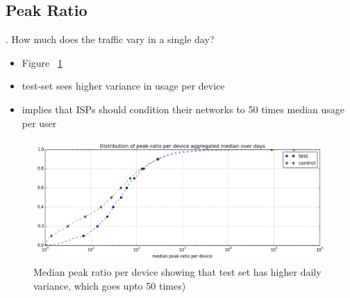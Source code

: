 \subsection{Peak Ratio}
\label{subsec:peak-ratio}




. How much does the traffic vary in a single day?

\begin{itemize}
\itemsep0em 
\item Figure ~\ref{fig:CDF-peak-ratio-median}
\item test-set sees higher variance in usage per device
\item implies that ISPs should condition their networks to 50 times median usage per user
\end{itemize}



\begin{figure}[ht!]
\begin{minipage}{0.90\linewidth}
\centering
\includegraphics[width=1\linewidth]{figures/peakratio-CDF-devices-MEDIAN.png}
\caption{Median peak ratio per device showing that test set has higher daily variance, which goes upto 50 times)}
\label{fig:CDF-peak-ratio-median}
\end{minipage}
\end{figure}








%
%

